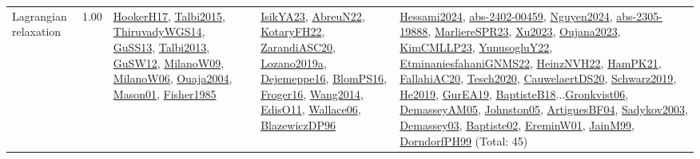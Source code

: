 {\begin{longtable}{p{3cm}r>{\raggedright\arraybackslash}p{6cm}>{\raggedright\arraybackslash}p{6cm}>{\raggedright\arraybackslash}p{8cm}}
\index{Lagrangian relaxation}\index{Algorithms!Lagrangian relaxation}Lagrangian relaxation &  1.00 & \hyperref[detail:HookerH17]{HookerH17}, \hyperref[detail:Talbi2015]{Talbi2015}, \hyperref[detail:ThiruvadyWGS14]{ThiruvadyWGS14}, \hyperref[detail:GuSS13]{GuSS13}, \hyperref[detail:Talbi2013]{Talbi2013}, \hyperref[detail:GuSW12]{GuSW12}, \hyperref[detail:MilanoW09]{MilanoW09}, \hyperref[detail:MilanoW06]{MilanoW06}, \hyperref[detail:Ouaja2004]{Ouaja2004}, \hyperref[detail:Mason01]{Mason01}, \hyperref[detail:Fisher1985]{Fisher1985} & \hyperref[detail:IsikYA23]{IsikYA23}, \hyperref[detail:AbreuN22]{AbreuN22}, \hyperref[detail:KotaryFH22]{KotaryFH22}, \hyperref[detail:ZarandiASC20]{ZarandiASC20}, \hyperref[detail:Lozano2019a]{Lozano2019a}, \hyperref[detail:Dejemeppe16]{Dejemeppe16}, \hyperref[detail:BlomPS16]{BlomPS16}, \hyperref[detail:Froger16]{Froger16}, \hyperref[detail:Wang2014]{Wang2014}, \hyperref[detail:EdisO11]{EdisO11}, \hyperref[detail:Wallace06]{Wallace06}, \hyperref[detail:BlazewiczDP96]{BlazewiczDP96} & \hyperref[detail:Hessami2024]{Hessami2024}, \hyperref[detail:abs-2402-00459]{abs-2402-00459}, \hyperref[detail:Nguyen2024]{Nguyen2024}, \hyperref[detail:abs-2305-19888]{abs-2305-19888}, \hyperref[detail:MarliereSPR23]{MarliereSPR23}, \hyperref[detail:Xu2023]{Xu2023}, \hyperref[detail:Oujana2023]{Oujana2023}, \hyperref[detail:KimCMLLP23]{KimCMLLP23}, \hyperref[detail:YunusogluY22]{YunusogluY22}, \hyperref[detail:EtminaniesfahaniGNMS22]{EtminaniesfahaniGNMS22}, \hyperref[detail:HeinzNVH22]{HeinzNVH22}, \hyperref[detail:HamPK21]{HamPK21}, \hyperref[detail:FallahiAC20]{FallahiAC20}, \hyperref[detail:Tesch2020]{Tesch2020}, \hyperref[detail:CauwelaertDS20]{CauwelaertDS20}, \hyperref[detail:Schwarz2019]{Schwarz2019}, \hyperref[detail:He2019]{He2019}, \hyperref[detail:GurEA19]{GurEA19}, \hyperref[detail:BaptisteB18]{BaptisteB18}...\hyperref[detail:Gronkvist06]{Gronkvist06}, \hyperref[detail:DemasseyAM05]{DemasseyAM05}, \hyperref[detail:Johnston05]{Johnston05}, \hyperref[detail:ArtiguesBF04]{ArtiguesBF04}, \hyperref[detail:Sadykov2003]{Sadykov2003}, \hyperref[detail:Demassey03]{Demassey03}, \hyperref[detail:Baptiste02]{Baptiste02}, \hyperref[detail:EreminW01]{EreminW01}, \hyperref[detail:JainM99]{JainM99}, \hyperref[detail:DorndorfPH99]{DorndorfPH99} (Total: 45)\\

\end{longtable}}
